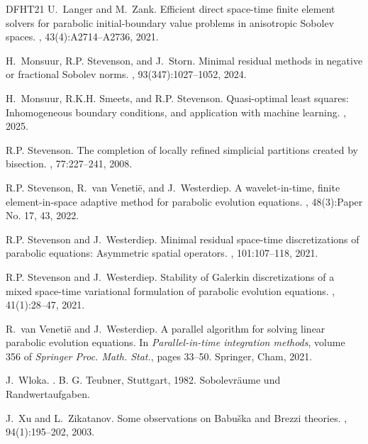 \documentclass{amsart}
\numberwithin{equation}{section}
\newcommand{\1}{\mathbb 1}
\begin{document}
\begin{thebibliography}{DFHT21}
U.~Langer and M.~Zank.
\newblock Efficient direct space-time finite element solvers for parabolic
  initial-boundary value problems in anisotropic {S}obolev spaces.
, 43(4):A2714--A2736, 2021.

H.~Monsuur, R.P. Stevenson, and J.~Storn.
\newblock Minimal residual methods in negative or fractional {S}obolev norms.
, 93(347):1027--1052, 2024.

H.~Monsuur, R.K.H. Smeets, and R.P. Stevenson.
\newblock Quasi-optimal least squares: Inhomogeneous boundary conditions, and
  application with machine learning.
, 2025.

R.P. Stevenson.
\newblock The completion of locally refined simplicial partitions created by
  bisection.
, 77:227--241, 2008.

R.P. Stevenson, R.~van Veneti\"{e}, and J.~Westerdiep.
\newblock A wavelet-in-time, finite element-in-space adaptive method for
  parabolic evolution equations.
, 48(3):Paper No. 17, 43, 2022.

R.P. Stevenson and J.~Westerdiep.
\newblock Minimal residual space-time discretizations of parabolic equations:
  {A}symmetric spatial operators.
, 101:107--118, 2021.

R.P. Stevenson and J.~Westerdiep.
\newblock Stability of {G}alerkin discretizations of a mixed space-time
  variational formulation of parabolic evolution equations.
, 41(1):28--47, 2021.

R.~van Veneti\"{e} and J.~Westerdiep.
\newblock A parallel algorithm for solving linear parabolic evolution
  equations.
\newblock In {\em Parallel-in-time integration methods}, volume 356 of {\em
  Springer Proc. Math. Stat.}, pages 33--50. Springer, Cham, 2021.

J.~Wloka.
.
\newblock B. G. Teubner, Stuttgart, 1982.
\newblock Sobolevr\"aume und Randwertaufgaben.

J.~Xu and L.~Zikatanov.
\newblock Some observations on {B}abu\v ska and {B}rezzi theories.
, 94(1):195--202, 2003.

\end{thebibliography}
%
%
\end{document}
